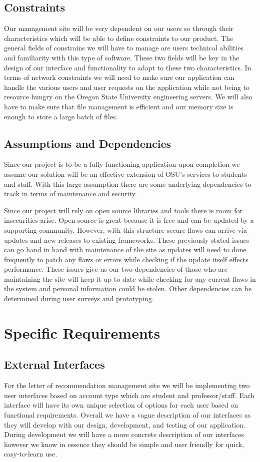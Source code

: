 \documentclass[onecolumn, draftclsnofoot,10pt, compsoc]{IEEEtran}
\begin{document}
\subsection{Constraints}
Our management site will be very dependent on our users so through their characteristics which will be able to define constraints to our product. The general fields of constrains we will have to manage are users technical abilities and familiarity with this type of software. These two fields will be key in the design of our interface and functionality to adapt to these two characteristics. In terms of network constraints we will need to make sure our application can handle the various users and user requests on the application while not being to resource hungry on the Oregon State University engineering servers. We will also have to make sure that file management is efficient and our memory size is enough to store a large batch of files. 

\subsection{Assumptions and Dependencies}
Since our project is to be a fully functioning application upon completion we assume our solution will be an effective extension of OSU's services to students and staff. With this large assumption there are some underlying dependencies to track in terms of maintenance and security. 

Since our project will rely on open source libraries and tools there is room for insecurities arise. Open source is great because it is free and can be updated by a supporting community. However, with this structure secure flaws can arrive via updates and new releases to existing frameworks. These previously stated issues can go hand in hand with maintenance of the site as updates will need to done frequently to patch any flaws or errors while checking if the update itself effects performance. These issues give us our two dependencies of those who are maintaining the site will keep it up to date while checking for any current flaws in the system and personal information could be stolen. Other dependencies can be determined during user surveys and prototyping. 

\section{Specific Requirements}
\subsection{External Interfaces}
For the letter of recommendation management site we will be implementing two user interfaces based on account type which are student and professor/staff. Each interface will have its own unique selection of options for each user based on functional requirements. Overall we have a vague description of our interfaces as they will develop with our design, development, and testing of our application. During development we will have a more concrete description of our interfaces however we know in essence they should be simple and user friendly for quick, easy-to-learn use. 
\end{document}
